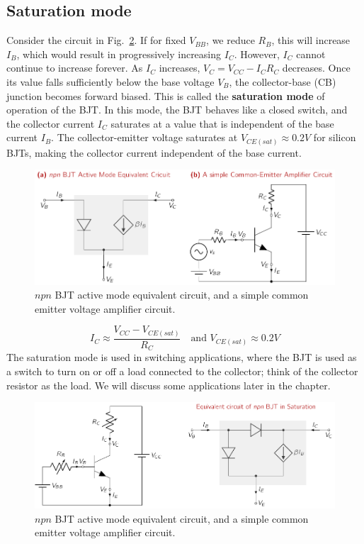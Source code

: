 \subsection{Saturation mode}
Consider the circuit in Fig.~\ref{fig:03-bjt-sat-eqt}. If for fixed $V_{BB}$, we reduce $R_B$, this will increase $I_B$, which would result in progressively increasing $I_C$. However, $I_C$ cannot continue to increase forever. As $I_C$ increases, $V_C = V_{CC} - I_{C}R_{C}$ decreases. Once its value falls sufficiently below the base voltage $V_B$, the collector-base (CB) junction becomes forward biased. This is called the \textbf{saturation mode} of operation of the BJT. In this mode, the BJT behaves like a closed switch, and the collector current $I_C$ saturates at a value that is independent of the base current $I_B$. The collector-emitter voltage saturates at $V_{CE(sat)} \approx 0.2V$ for silicon BJTs, making the collector current independent of the base current.
\begin{figure}[t]
    \centering
    \includegraphics[width=\textwidth]{figure/ch03/fig03-bjt-active-eq.pdf}
    \caption{$npn$ BJT active mode equivalent circuit, and a simple common emitter voltage amplifier circuit.}
    \label{fig:03-bjt-active-eqt}
\end{figure}
\begin{equation}
    I_C \approx \frac{V_{CC} - V_{CE(sat)}}{R_C} \quad \text{and } V_{CE(sat)} \approx 0.2V
    \label{eq:03-bjt-sat-ic}
\end{equation}
The saturation mode is used in switching applications, where the BJT is used as a switch to turn on or off a load connected to the collector; think of the collector resistor as the load. We will discuss some applications later in the chapter.

\begin{figure}[b]
    \centering
    \includegraphics[width=\textwidth]{figure/ch03/fig03-bjt-sat-eq.pdf}
    \caption{$npn$ BJT active mode equivalent circuit, and a simple common emitter voltage amplifier circuit.}
    \label{fig:03-bjt-sat-eqt}
\end{figure}

